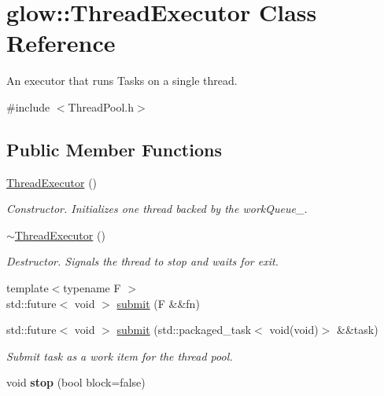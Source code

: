 \hypertarget{classglow_1_1_thread_executor}{}\section{glow\+:\+:Thread\+Executor Class Reference}
\label{classglow_1_1_thread_executor}


An executor that runs Tasks on a single thread.  




{\ttfamily \#include $<$Thread\+Pool.\+h$>$}

\subsection*{Public Member Functions}
\begin{DoxyCompactItemize}
\item 
\mbox{\label{classglow_1_1_thread_executor_a11897142fea378fe51557e56b64e6abc}} 
\hyperlink{classglow_1_1_thread_executor_a11897142fea378fe51557e56b64e6abc}{Thread\+Executor} ()
\begin{DoxyCompactList}\small\item\em Constructor. Initializes one thread backed by the work\+Queue\+\_\+. \end{DoxyCompactList}\item 
\mbox{\label{classglow_1_1_thread_executor_a52fcf5308d249813074c7aaf2e2e41e0}} 
\hyperlink{classglow_1_1_thread_executor_a52fcf5308d249813074c7aaf2e2e41e0}{$\sim$\+Thread\+Executor} ()
\begin{DoxyCompactList}\small\item\em Destructor. Signals the thread to stop and waits for exit. \end{DoxyCompactList}\item 
{\footnotesize template$<$typename F $>$ }\\std\+::future$<$ void $>$ \hyperlink{classglow_1_1_thread_executor_af5cda76c60df09c55b796bda2c2009fc}{submit} (F \&\&fn)
\item 
\mbox{\label{classglow_1_1_thread_executor_acd99d215fa8e7f8432021a7620861cc0}} 
std\+::future$<$ void $>$ \hyperlink{classglow_1_1_thread_executor_acd99d215fa8e7f8432021a7620861cc0}{submit} (std\+::packaged\+\_\+task$<$ void(void)$>$ \&\&task)
\begin{DoxyCompactList}\small\item\em Submit {\ttfamily task} as a work item for the thread pool. \end{DoxyCompactList}\item 
\mbox{\label{classglow_1_1_thread_executor_a6cc911aa8d7bdf3282d8c6c9ec19a3d7}} 
void {\bfseries stop} (bool block=false)
\end{DoxyCompactItemize}
